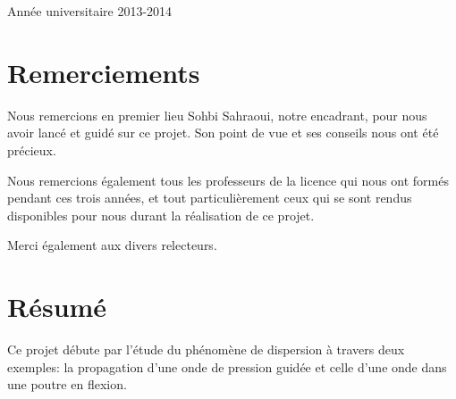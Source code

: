 \documentclass[a4paper,11pt]{report} %
\begin{document}
\begin{titlepage}


{\large Année universitaire 2013-2014}\\[3cm] %


 

\vfill %

\end{titlepage}

\tableofcontents

\newpage %

\section*{Remerciements}
Nous remercions en premier lieu Sohbi Sahraoui, notre encadrant, pour nous avoir lancé et guidé sur ce projet. Son point de vue et ses conseils nous ont été précieux.

Nous remercions également tous les professeurs de la licence qui nous ont formés pendant ces trois années, et tout particulièrement ceux qui se sont rendus disponibles pour nous durant la réalisation de ce projet.

Merci également aux divers relecteurs.
\bigskip

\section*{Résumé}
Ce projet débute par l'étude du phénomène de dispersion à travers deux exemples: la propagation d'une onde de pression guidée et celle d'une onde dans une poutre en flexion.
\end{document}
